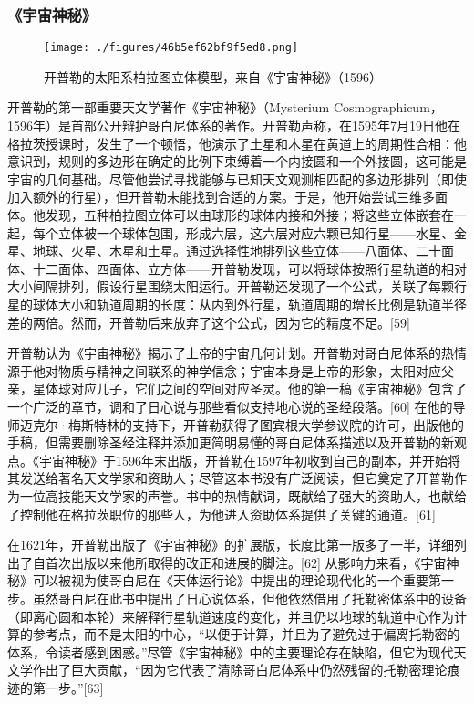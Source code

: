 \subsubsection{《宇宙神秘》}
\begin{figure}[ht]
\centering
\texttt{[image: ./figures/46b5ef62bf9f5ed8.png]}
\caption{开普勒的太阳系柏拉图立体模型，来自《宇宙神秘》（1596）} \label{fig_KPL1_11}
\end{figure}
开普勒的第一部重要天文学著作《宇宙神秘》（Mysterium Cosmographicum，1596年）是首部公开辩护哥白尼体系的著作。开普勒声称，在1595年7月19日他在格拉茨授课时，发生了一个顿悟，他演示了土星和木星在黄道上的周期性合相：他意识到，规则的多边形在确定的比例下束缚着一个内接圆和一个外接圆，这可能是宇宙的几何基础。尽管他尝试寻找能够与已知天文观测相匹配的多边形排列（即使加入额外的行星），但开普勒未能找到合适的方案。于是，他开始尝试三维多面体。他发现，五种柏拉图立体可以由球形的球体内接和外接；将这些立体嵌套在一起，每个立体被一个球体包围，形成六层，这六层对应六颗已知行星——水星、金星、地球、火星、木星和土星。通过选择性地排列这些立体——八面体、二十面体、十二面体、四面体、立方体——开普勒发现，可以将球体按照行星轨道的相对大小间隔排列，假设行星围绕太阳运行。开普勒还发现了一个公式，关联了每颗行星的球体大小和轨道周期的长度：从内到外行星，轨道周期的增长比例是轨道半径差的两倍。然而，开普勒后来放弃了这个公式，因为它的精度不足。[59]

开普勒认为《宇宙神秘》揭示了上帝的宇宙几何计划。开普勒对哥白尼体系的热情源于他对物质与精神之间联系的神学信念；宇宙本身是上帝的形象，太阳对应父亲，星体球对应儿子，它们之间的空间对应圣灵。他的第一稿《宇宙神秘》包含了一个广泛的章节，调和了日心说与那些看似支持地心说的圣经段落。[60] 在他的导师迈克尔·梅斯特林的支持下，开普勒获得了图宾根大学参议院的许可，出版他的手稿，但需要删除圣经注释并添加更简明易懂的哥白尼体系描述以及开普勒的新观点。《宇宙神秘》于1596年末出版，开普勒在1597年初收到自己的副本，并开始将其发送给著名天文学家和资助人；尽管这本书没有广泛阅读，但它奠定了开普勒作为一位高技能天文学家的声誉。书中的热情献词，既献给了强大的资助人，也献给了控制他在格拉茨职位的那些人，为他进入资助体系提供了关键的通道。[61]

在1621年，开普勒出版了《宇宙神秘》的扩展版，长度比第一版多了一半，详细列出了自首次出版以来他所取得的改正和进展的脚注。[62] 从影响力来看，《宇宙神秘》可以被视为使哥白尼在《天体运行论》中提出的理论现代化的一个重要第一步。虽然哥白尼在此书中提出了日心说体系，但他依然借用了托勒密体系中的设备（即离心圆和本轮）来解释行星轨道速度的变化，并且仍以地球的轨道中心作为计算的参考点，而不是太阳的中心，“以便于计算，并且为了避免过于偏离托勒密的体系，令读者感到困惑。”尽管《宇宙神秘》中的主要理论存在缺陷，但它为现代天文学作出了巨大贡献，“因为它代表了清除哥白尼体系中仍然残留的托勒密理论痕迹的第一步。”[63]
